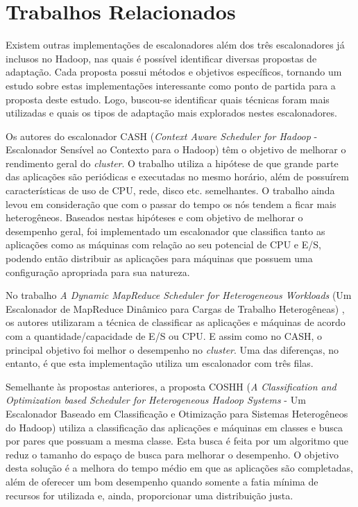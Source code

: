 \section{Trabalhos Relacionados}
Existem outras implementações de escalonadores além dos três escalonadores já inclusos no Hadoop, nas quais é possível identificar diversas propostas de adaptação. Cada proposta possui métodos e objetivos específicos, tornando um estudo sobre estas implementações interessante como ponto de partida para a proposta deste estudo. Logo, buscou-se identificar quais técnicas foram mais utilizadas e quais os tipos de adaptação mais explorados nestes escalonadores. 



Os autores do escalonador CASH (\emph{Context Aware Scheduler for Hadoop} - Escalonador Sensível ao Contexto para o Hadoop) \cite{CASH} têm o objetivo de melhorar o rendimento geral do \emph{cluster}. O trabalho utiliza a hipótese de que grande parte das aplicações são periódicas e executadas no mesmo horário, além de possuírem características de uso de CPU, rede, disco etc. semelhantes. O trabalho ainda levou em consideração que com o passar do tempo os nós tendem a ficar mais heterogêneos. Baseados nestas hipóteses e com objetivo de melhorar o desempenho geral, foi implementado um escalonador que classifica tanto as aplicações como as máquinas com relação ao seu potencial de CPU e E/S, podendo então distribuir as aplicações para máquinas que possuem uma configuração apropriada para sua natureza.

No trabalho \textit{A Dynamic MapReduce Scheduler for Heterogeneous Workloads} (Um Escalonador de MapReduce Dinâmico para Cargas de Trabalho Heterogêneas) \cite{DMRSHW}, os autores utilizaram a técnica de classificar as aplicações e máquinas de acordo com a quantidade/capacidade de E/S ou CPU. E assim como no CASH, o principal objetivo foi melhor o desempenho no \textit{cluster}. Uma das diferenças, no entanto, é que esta implementação utiliza um escalonador com três filas.

Semelhante às propostas anteriores, a proposta COSHH (\textit{A Classification and Optimization based Scheduler for Heterogeneous Hadoop Systems} - Um Escalonador Baseado em Classificação e Otimização para Sistemas Heterogêneos do Hadoop) \cite{COSHH} utiliza a classificação das aplicações e máquinas em classes e busca por pares que possuam a mesma classe. Esta busca é feita por um algoritmo que reduz o tamanho do espaço de busca para melhorar o desempenho. O objetivo desta solução é a melhora do tempo médio em que as aplicações são completadas, além de oferecer um bom desempenho quando somente a fatia mínima de recursos for utilizada e, ainda, proporcionar uma distribuição justa.

